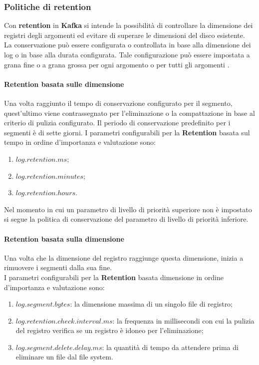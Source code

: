 \subsubsection{Politiche di retention}
Con \textbf{retention} in \textbf{Kafka} si intende la possibilità di controllare la dimensione dei registri
degli argomenti ed evitare di superare le dimensioni del disco esistente.\\
La conservazione può essere configurata o controllata in base alla dimensione dei \gls{log}{} o in
base alla durata configurata. Tale configurazione può essere impostata a grana fine o a
grana grossa per ogni argomento o per tutti gli argomenti \cite{site:Kafka_Retention}.
\paragraph{Retention basata sulle dimensione}
Una volta raggiunto il tempo di conservazione configurato per il segmento, quest'ultimo viene contrassegnato per l'eliminazione o la \gls{compattazione}{} in base al criterio di pulizia configurato. Il periodo di conservazione predefinito per i segmenti è di sette giorni.
I parametri configurabili per la \textbf{Retention} basata sul tempo in ordine d'importanza e valutazione sono:
\begin{enumerate}
    \item $log.retention.ms$;
    \item $log.retention.minutes$;
    \item $log.retention.hours$.
\end{enumerate}
Nel momento in cui un parametro di livello di priorità superiore non è impostato si segue la politica di conservazione del parametro di livello di priorità inferiore.\\
\paragraph{Retention basata sulla dimensione}
Una volta che la dimensione del registro raggiunge questa dimensione, inizia a rimuovere i segmenti dalla sua fine.\\

I parametri configurabili per la \textbf{Retention} basata dimensione in ordine d'importanza e valutazione sono:
\begin{enumerate}
    \item $log.segment.bytes$: la dimensione massima di un singolo file di registro;
    \item $log.retention.check.interval.ms$: la frequenza in millisecondi con cui la pulizia del registro verifica se un registro è idoneo per l'eliminazione;
    \item $log.segment.delete.delay.ms$: la quantità di tempo da attendere prima di eliminare un file dal file system.
\end{enumerate}


